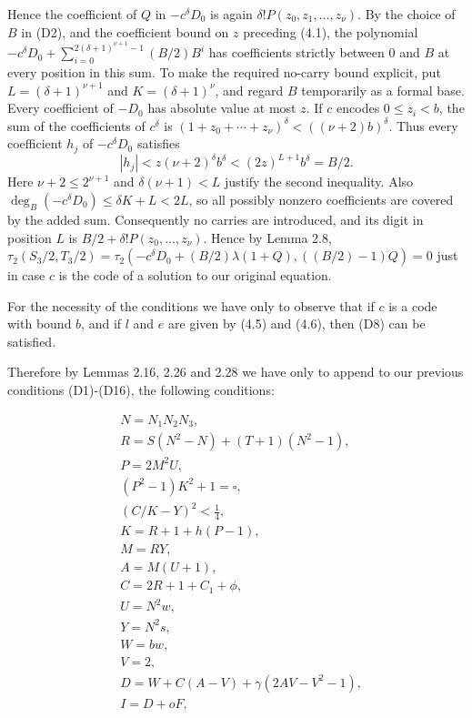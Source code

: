\documentclass[11pt,a4paper]{article}
\begin{document}
Hence the coefficient of $Q$ in $-c^{\delta} D_{0}$ is again $\delta!P\left(z_{0},\allowbreak  z_{1},\allowbreak  \ldots,\allowbreak  z_{\nu}\right)$. By the choice of $B$ in (D2), and the coefficient bound on $z$ preceding (4.1), the polynomial $-c^{\delta} D_{0}+\sum_{i=0}^{2(\delta+1)^{\nu+1}-1}(B / 2) B^{i}$ has coefficients strictly between $0$ and $B$ at every position in this sum. To make the required no-carry bound explicit, put $L=(\delta+1)^{\nu+1}$ and $K=(\delta+1)^\nu$, and regard $B$ temporarily as a formal base. Every coefficient of $-D_0$ has absolute value at most $z$. If $c$ encodes $0\leq z_i<b$, the sum of the coefficients of $c^\delta$ is $(1+z_0+\cdots+z_\nu)^\delta<((\nu+2)b)^\delta$. Thus every coefficient $h_j$ of $-c^\delta D_0$ satisfies
\[
 |h_j|<z(\nu+2)^\delta b^\delta
       <(2z)^{L+1}b^\delta=B/2.
\]
Here $\nu+2\leq2^{\nu+1}$ and $\delta(\nu+1)<L$ justify the second inequality. Also $\deg_B(-c^\delta D_0)\leq\delta K+L<2L$, so all possibly nonzero coefficients are covered by the added sum. Consequently no carries are introduced, and its digit in position $L$ is $B/2+\delta!P(z_0,\ldots,z_\nu)$. Hence by Lemma 2.8, $\tau_{2}\left(S_{3} / 2,\allowbreak  T_{3} / 2\right)=\tau_{2}\left(-c^{\delta} D_{0}+(B / 2) \lambda(1+Q),\allowbreak ((B / 2)-1) Q\right)=0$ just in case $c$ is the code of a solution to our original equation.

For the necessity of the conditions we have only to observe that if $c$ is a code with bound $b$, and if $l$ and $e$ are given by (4.5) and (4.6), then (D8) can be satisfied.

Therefore by Lemmas 2.16, 2.26 and 2.28 we have only to append to our previous conditions (D1)-(D16), the following conditions:

\begin{align*}
& N=N_{1} N_{2} N_{3},  \tag{D17}\\
& R=S\left(N^{2}-N\right)+(T+1)\left(N^{2}-1\right),  \tag{D18}\\
& P=2 M^{2} U,  \tag{D19}\\
& \left(P^{2}-1\right) K^{2}+1=\square,  \tag{D20}\\
& (C / K-Y)^{2}<\frac{1}{4},  \tag{D21}\\
& K=R+1+h(P-1),  \tag{D22}\\
& M=R Y,  \tag{D23}\\
& A=M(U+1),  \tag{D24}\\
& C=2 R+1+C_{1}+\phi,  \tag{D25}\\
& U=N^{2} w,  \tag{D26}\\
& Y=N^{2} s,  \tag{D27}\\
& W=b w,  \tag{D28}\\
& V=2,  \tag{D29}\\
& D=W+C(A-V)+\gamma\left(2AV-V^{2}-1\right),  \tag{D30}\\
& I=D+o F, \tag{D31}
\end{align*}
\end{document}
